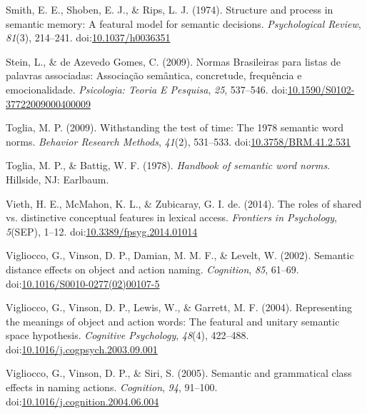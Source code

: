 \documentclass[english,,man]{apa6}
\begin{document}
\leavevmode\hypertarget{ref-Smith1974}{}%
Smith, E. E., Shoben, E. J., \& Rips, L. J. (1974). Structure and process in semantic memory: A featural model for semantic decisions. \emph{Psychological Review}, \emph{81}(3), 214--241. doi:\href{https://doi.org/10.1037/h0036351}{10.1037/h0036351}

\leavevmode\hypertarget{ref-Stein2009}{}%
Stein, L., \& de Azevedo Gomes, C. (2009). Normas Brasileiras para listas de palavras associadas: Associação semântica, concretude, frequência e emocionalidade. \emph{Psicologia: Teoria E Pesquisa}, \emph{25}, 537--546. doi:\href{https://doi.org/10.1590/S0102-37722009000400009}{10.1590/S0102-37722009000400009}

\leavevmode\hypertarget{ref-Toglia2009}{}%
Toglia, M. P. (2009). Withstanding the test of time: The 1978 semantic word norms. \emph{Behavior Research Methods}, \emph{41}(2), 531--533. doi:\href{https://doi.org/10.3758/BRM.41.2.531}{10.3758/BRM.41.2.531}

\leavevmode\hypertarget{ref-Toglia1978}{}%
Toglia, M. P., \& Battig, W. F. (1978). \emph{Handbook of semantic word norms}. Hillside, NJ: Earlbaum.

\leavevmode\hypertarget{ref-Vieth2014}{}%
Vieth, H. E., McMahon, K. L., \& Zubicaray, G. I. de. (2014). The roles of shared vs. distinctive conceptual features in lexical access. \emph{Frontiers in Psychology}, \emph{5}(SEP), 1--12. doi:\href{https://doi.org/10.3389/fpsyg.2014.01014}{10.3389/fpsyg.2014.01014}

\leavevmode\hypertarget{ref-Vigliocco2002}{}%
Vigliocco, G., Vinson, D. P., Damian, M. M. F., \& Levelt, W. (2002). Semantic distance effects on object and action naming. \emph{Cognition}, \emph{85}, 61--69. doi:\href{https://doi.org/10.1016/S0010-0277(02)00107-5}{10.1016/S0010-0277(02)00107-5}

\leavevmode\hypertarget{ref-Vigliocco2004}{}%
Vigliocco, G., Vinson, D. P., Lewis, W., \& Garrett, M. F. (2004). Representing the meanings of object and action words: The featural and unitary semantic space hypothesis. \emph{Cognitive Psychology}, \emph{48}(4), 422--488. doi:\href{https://doi.org/10.1016/j.cogpsych.2003.09.001}{10.1016/j.cogpsych.2003.09.001}

\leavevmode\hypertarget{ref-Vigliocco2005}{}%
Vigliocco, G., Vinson, D. P., \& Siri, S. (2005). Semantic and grammatical class effects in naming actions. \emph{Cognition}, \emph{94}, 91--100. doi:\href{https://doi.org/10.1016/j.cognition.2004.06.004}{10.1016/j.cognition.2004.06.004}
\end{document}

